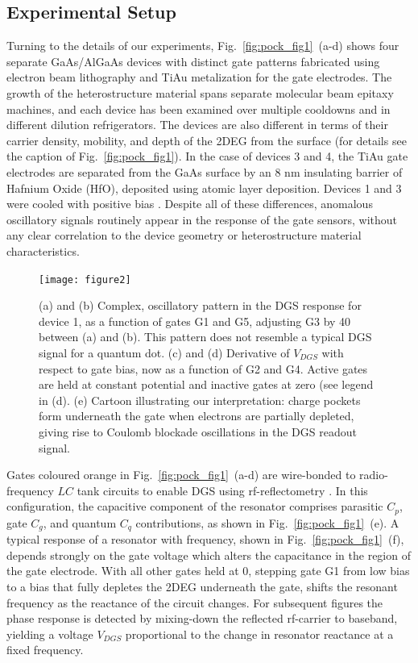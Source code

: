 \subsection{Experimental Setup}
Turning to the details of our experiments, Fig.~\ref{fig:pock_fig1}~(a-d) shows four separate GaAs/AlGaAs devices with distinct gate patterns fabricated using electron beam lithography and TiAu metalization for the gate electrodes. The growth of the heterostructure material spans separate molecular beam epitaxy machines, and each device has been examined over multiple cooldowns and in different dilution refrigerators. The devices are also different in terms of their carrier density, mobility, and depth of the 2DEG from the surface (for details see the caption of Fig.~\ref{fig:pock_fig1}).  In the case of devices 3 and 4, the TiAu gate electrodes are separated from the GaAs surface by an 8 nm insulating barrier of Hafnium Oxide (HfO), deposited using atomic layer deposition. Devices 1 and 3 were cooled with positive bias \cite{PhysRevB.72.115331}. Despite all of these differences, anomalous oscillatory signals routinely appear in the response of the gate sensors, without any clear correlation to the device geometry or heterostructure material characteristics.

\begin{figure}
\texttt{[image: figure2]}
\caption{\label{fig:pock_fig2} (a) and (b) Complex, oscillatory pattern in the DGS response for device 1, as a function of gates G1 and G5, adjusting G3 by \SI{40}{\mv} between (a) and (b). This pattern does not resemble a typical DGS signal for a quantum dot.  (c) and (d) Derivative of $V_{DGS}$ with respect to gate bias, now as a function of G2 and G4. Active gates are held at constant potential and inactive gates at zero (see legend in (d). (e) Cartoon illustrating our interpretation: charge pockets form underneath the gate when electrons are partially depleted, giving rise to Coulomb blockade oscillations in the DGS readout signal.}
\end{figure}

Gates coloured orange in Fig.~\ref{fig:pock_fig1}~(a-d) are wire-bonded to radio-frequency $LC$ tank circuits to enable DGS using rf-reflectometry \cite{Colless_PRL,doi:10.1063/1.4868107}. In this configuration, the capacitive component of the resonator comprises parasitic $C_p$, gate $C_g$, and quantum $C_q$ contributions, as shown in Fig.~\ref{fig:pock_fig1}~(e). A typical response of a resonator with frequency, shown in Fig.~\ref{fig:pock_fig1}~(f), depends strongly on the gate voltage which alters the capacitance in the region of the gate electrode. With all other gates held at \SI{0}{\mv}, stepping gate G1 from low bias to a bias that fully depletes the 2DEG underneath the gate, shifts the resonant frequency as the reactance of the circuit changes. For subsequent figures the phase response is detected by mixing-down the reflected rf-carrier to baseband, yielding a voltage $V_{DGS}$ proportional to the change in resonator reactance at a fixed frequency.

